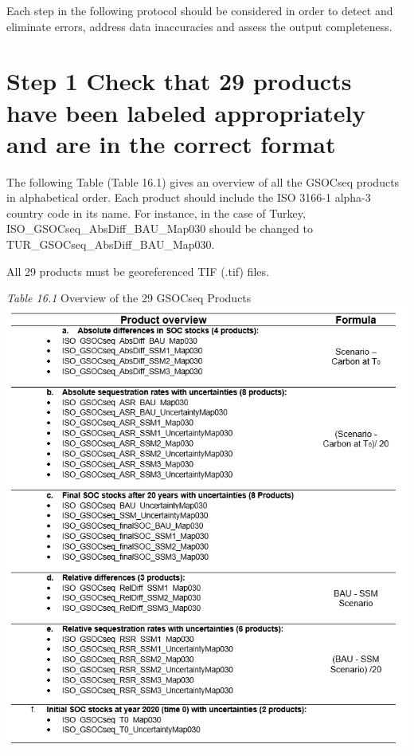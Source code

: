 \documentclass[
  10pt,
  b5paper,
]{book}
\begin{document}
Each step in the following protocol should be considered in order to detect and eliminate errors, address data inaccuracies and assess the output completeness.

\hypertarget{step-1-check-that-29-products-have-been-labeled-appropriately-and-are-in-the-correct-format}{%
\section*{Step 1 Check that 29 products have been labeled appropriately and are in the correct format}\label{step-1-check-that-29-products-have-been-labeled-appropriately-and-are-in-the-correct-format}}

The following Table (Table 16.1) gives an overview of all the GSOCseq products in alphabetical order. Each product should include the ISO 3166-1 alpha-3 country code in its name. For instance, in the case of Turkey, ISO\_GSOCseq\_AbsDiff\_BAU\_Map030 should be changed to TUR\_GSOCseq\_AbsDiff\_BAU\_Map030.

All 29 products must be georeferenced TIF (.tif) files.

\emph{Table 16.1} Overview of the 29 GSOCseq Products
\includegraphics{tables/Table_16.1.PNG}
\end{document}
